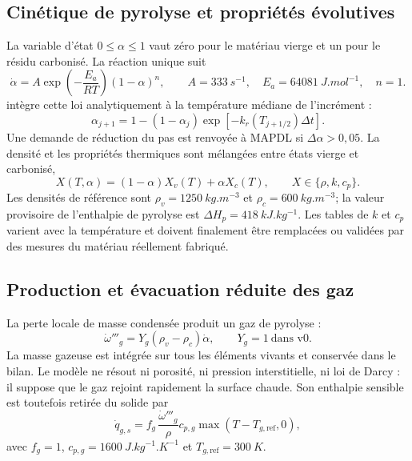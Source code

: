 \documentclass[oneside,openany]{amsdtx}
\begin{document}
\subsection{Cinétique de pyrolyse et propriétés évolutives}
La variable d'état \(0\leq\alpha\leq1\) vaut zéro pour le matériau vierge et
un pour le résidu carbonisé. La réaction unique suit
\begin{equation}
 \dot\alpha=A\exp\!\left(-\frac{E_a}{RT}\right)(1-\alpha)^n,
 \qquad
 A=\SI{333}{s^{-1}},\quad E_a=\SI{64081}{J.mol^{-1}},\quad n=1.
 \label{eq:v0-arrhenius}
\end{equation}
 intègre cette loi analytiquement à la température médiane de
l'incrément :
\begin{equation}
 \alpha_{j+1}=1-(1-\alpha_j)\exp[-k_r(T_{j+1/2})\Delta t].
\end{equation}
Une demande de réduction du pas est renvoyée à MAPDL si
\(\Delta\alpha>0{,}05\). La densité et les propriétés thermiques sont mélangées
entre états vierge et carbonisé,
\begin{equation}
 X(T,\alpha)=(1-\alpha)X_v(T)+\alpha X_c(T),
 \qquad X\in\{\rho,k,c_p\}.
 \label{eq:v0-mixture}
\end{equation}
Les densités de référence sont \(\rho_v=\SI{1250}{kg.m^{-3}}\) et
\(\rho_c=\SI{600}{kg.m^{-3}}\); la valeur provisoire de l'enthalpie de
pyrolyse est \(\Delta H_p=\SI{418}{kJ.kg^{-1}}\). Les tables de \(k\) et
\(c_p\) varient avec la température et doivent finalement être remplacées ou
validées par des mesures du matériau réellement fabriqué.

\subsection{Production et évacuation réduite des gaz}
La perte locale de masse condensée produit un gaz de pyrolyse :
\begin{equation}
 \dot\omega'''_g=Y_g(\rho_v-\rho_c)\dot\alpha,
 \qquad Y_g=1\ \text{dans v0}.
 \label{eq:v0-gas-source}
\end{equation}
La masse gazeuse est intégrée sur tous les éléments vivants et conservée dans
le bilan. Le modèle ne résout ni porosité, ni pression interstitielle, ni loi de
Darcy : il suppose que le gaz rejoint rapidement la surface chaude. Son
enthalpie sensible est toutefois retirée du solide par
\begin{equation}
 \dot q_{g,s}=f_g\,\frac{\dot\omega'''_g}{\rho}
 c_{p,g}\max(T-T_{g,\mathrm{ref}},0),
\end{equation}
avec \(f_g=1\), \(c_{p,g}=\SI{1600}{J.kg^{-1}.K^{-1}}\) et
\(T_{g,\mathrm{ref}}=\SI{300}{K}\).
\end{document}
